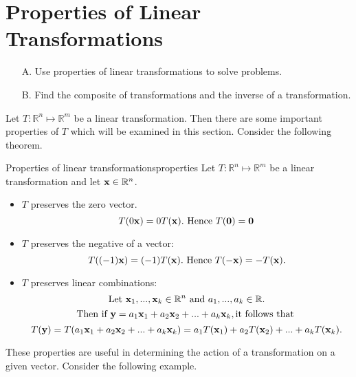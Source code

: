 \section{Properties of Linear Transformations}

\begin{outcome}
\begin{enumerate}
\item[A.] Use properties of linear transformations to solve problems. 

\item[B.] Find the composite of transformations and the inverse of a transformation.
\end{enumerate}
\end{outcome}

Let $T: \mathbb{R}^n \mapsto \mathbb{R}^m$ be a linear transformation. Then there are some important properties of $T$ which will be examined in this section. 
Consider the following theorem.

\begin{theorem}{Properties of linear transformations}{properties}
Let $T: \mathbb{R}^n \mapsto \mathbb{R}^m$ be a linear transformation and let ${\bf x} \in \mathbb{R}^n$. 

\begin{itemize}
\item $T$ preserves the zero vector. 
\[
T(0{\bf x}) = 0 T({\bf x}). \mbox{ Hence }T({\bf 0}) = {\bf 0}
\]
\item $T$ preserves the negative of a vector:
\[
T( (-1){\bf x})=(-1)T({\bf x}). \mbox{ Hence }T(-{\bf x}) = -T({\bf x}).
\]
\item $T$ preserves linear combinations:
\[
\mbox{Let }{\bf x}_1, ..., {\bf x}_k \in \mathbb{R}^n \mbox{ and }a_1, ..., a_k \in \mathbb{R}.
\]
\[
\mbox{Then if }{\bf y} = a_1{\bf x}_1 + a_2{\bf x}_2 + ...+a_k {\bf x}_k, \mbox{it follows that }
\]
\[
T({\bf y}) = T(a_1{\bf x}_1 + a_2{\bf x}_2 + ...+a_k {\bf x}_k) = a_1T({\bf x}_1) + a_2T({\bf x}_2) + ...+a_k T({\bf x}_k).
\] 
\end{itemize}
\end{theorem}

These properties are useful in determining the action of a transformation on a given vector. Consider the following example.

